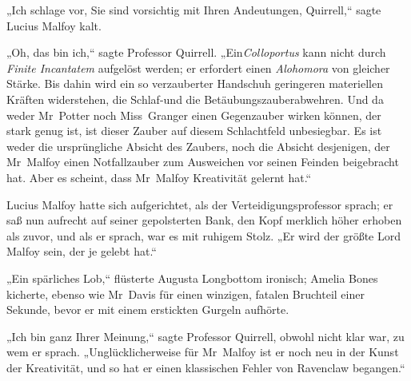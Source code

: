 „Ich schlage vor, Sie sind vorsichtig mit Ihren Andeutungen, Quirrell,“ sagte Lucius Malfoy kalt.

„Oh, das bin ich,“ sagte Professor Quirrell. „Ein\emph{Colloportus} kann nicht durch \emph{Finite Incantatem} aufgelöst werden; er erfordert einen \emph{Alohomora} von gleicher Stärke. Bis dahin wird ein so verzauberter Handschuh geringeren materiellen Kräften widerstehen, die Schlaf-und die Betäubungszauberabwehren. Und da weder Mr~Potter noch Miss~Granger einen Gegenzauber wirken können, der stark genug ist, ist dieser Zauber auf diesem Schlachtfeld unbesiegbar. Es ist weder die ursprüngliche Absicht des Zaubers, noch die Absicht desjenigen, der Mr~Malfoy einen Notfallzauber zum Ausweichen vor seinen Feinden beigebracht hat. Aber es scheint, dass Mr~Malfoy Kreativität gelernt hat.“

Lucius Malfoy hatte sich aufgerichtet, als der Verteidigungsprofessor sprach; er saß nun aufrecht auf seiner gepolsterten Bank, den Kopf merklich höher erhoben als zuvor, und als er sprach, war es mit ruhigem Stolz. „Er wird der größte Lord Malfoy sein, der je gelebt hat.“

„Ein spärliches Lob,“ flüsterte Augusta Longbottom ironisch; Amelia Bones kicherte, ebenso wie Mr~Davis für einen winzigen, fatalen Bruchteil einer Sekunde, bevor er mit einem erstickten Gurgeln aufhörte.

„Ich bin ganz Ihrer Meinung,“ sagte Professor Quirrell, obwohl nicht klar war, zu wem er sprach. „Unglücklicherweise für Mr~Malfoy ist er noch neu in der Kunst der Kreativität, und so hat er einen klassischen Fehler von Ravenclaw begangen.“


